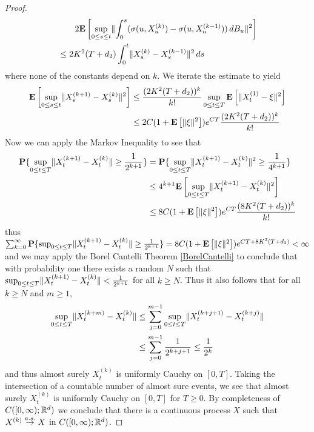 \begin{proof}
\begin{align*}
&\qquad 2\textbf{E}\left[\sup_{0 \leq s \leq t} \lVert \int_0^s (\sigma(u, X_u^{(k)}) - \sigma(u, X_u^{(k-1)})) \, dB_u \rVert^2 \right] \\
&\leq 2K^2(T + d_2) \int_0^t \lVert  X_s^{(k)} - X_s^{(k-1)} \rVert^2 \, ds 
\end{align*}
where none of the constants depend on $k$.  We iterate the estimate to yield
\begin{align*}
\textbf{E}\left[\sup_{0 \leq s \leq t} \lVert X_s^{(k+1)} - X_s^{(k)} \rVert^2\right] &\leq 
\frac{(2K^2(T + d_2))^k}{k!}\sup_{0 \leq t \leq T} \textbf{E}\left[\lVert  X_t^{(1)} - \xi \rVert^2\right] \\
&\leq 2 C(1 + \textbf{E}\left[\lVert \xi \rVert^2\right]) e^{CT} \frac{(2K^2(T + d_2))^k}{k!} 
\end{align*}
Now we can apply the Markov Inequality to see that
\begin{align*}
\textbf{P}\{\sup_{0 \leq t \leq T} \lVert X_t^{(k+1)} - X_t^{(k)} \rVert \geq \frac{1}{2^{k+1}}\} 
&= \textbf{P}\{\sup_{0 \leq t \leq T} \lVert X_t^{(k+1)} - X_t^{(k)} \rVert^2 \geq \frac{1}{4^{k+1}}\} \\
&\leq 4^{k+1} \textbf{E}\left[\sup_{0 \leq t \leq T} \lVert X_t^{(k+1)} - X_t^{(k)} \rVert^2\right] \\
&\leq 8 C(1 + \textbf{E}\left[\lVert \xi \rVert^2\right]) e^{CT} \frac{(8K^2(T + d_2))^k}{k!} 
\end{align*}
thus $\sum_{k=0}^\infty \textbf{P}\{\sup_{0 \leq t \leq T} \lVert X_t^{(k+1)} - X_t^{(k)} \rVert \geq \frac{1}{2^{k+1}}\} = 8 C(1 + \textbf{E}\left[\lVert \xi \rVert^2\right]) e^{CT +8K^2(T + d_2) } < \infty$
and we may apply the Borel Cantelli Theorem \ref{BorelCantelli} to conclude that with probability one there exists a random $N$ such that
$\sup_{0 \leq t \leq T} \lVert X_t^{(k+1)} - X_t^{(k)} \rVert < \frac{1}{2^{k+1}}$ for all $k \geq N$.  Thus it also follows that for all $k \geq N$ and $m \geq 1$,
\begin{align*}
\sup_{0 \leq t \leq T} \lVert X_t^{(k+m)} - X_t^{(k)} \rVert  &\leq \sum_{j=0}^{m-1} \sup_{0 \leq t \leq T} \lVert X_t^{(k+j+1)} - X_t^{(k+j)} \rVert \\
&\leq \sum_{j=0}^{m-1}  \frac{1}{2^{k+j+1}} \leq  \frac{1}{2^{k}}
\end{align*}
and thus almost surely $X^{(k)}_t$ is uniformly Cauchy on $[0,T]$.  Taking the intersection of a countable number of almost sure events, we see that almost surely
$X^{(k)}_t$ is uniformly Cauchy on $[0,T]$ for $T \geq 0$.  By completeness of $C([0,\infty); \mathbb{R}^d)$ we conclude that there is a continuous process $X$ such that
$X^{(k)} \overset{a.s.}\to X$ in $C([0,\infty); \mathbb{R}^d)$.  


\end{proof}
